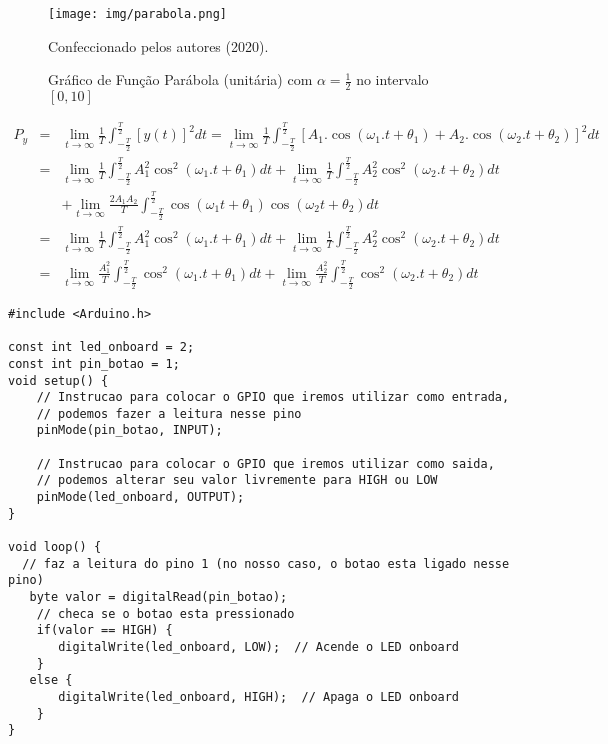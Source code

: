 
\begin{figure}[!h]
    \centering
    \texttt{[image: img/parabola.png]}
    \caption{Gráfico de Função Parábola (unitária) com $\alpha = \frac{1}{2}$ no intervalo $[0,10]$}
    \label{fig:rampa}
    \begin{flushright}
        Confeccionado pelos autores (2020).
    \end{flushright}
\end{figure} 


\begin{eqnarray*} \label{eq:py}
    P_y &=& \lim_{t\to\infty} \frac{1}{T} \int_{-\frac{T}{2}}^{\frac{T}{2}} [y(t)]^2 dt = \lim_{t\to\infty} \frac{1}{T} \int_{-\frac{T}{2}}^{\frac{T}{2}} [A_1.\cos{(\omega_1.t + \theta_1)}+A_2.\cos{(\omega_2.t + \theta_2)}]^2 dt \\
     &=& \lim_{t\to\infty} \frac{1}{T} \int_{-\frac{T}{2}}^{\frac{T}{2}} A_1^2 \cos^2(\omega_1.t+\theta_1) dt + \lim_{t\to\infty} \frac{1}{T} \int_{-\frac{T}{2}}^{\frac{T}{2}} A_2^2 \cos^2(\omega_2.t+\theta_2) dt \\
    && + \lim_{t\to\infty} \frac{2A_1A_2}{T} \int_{-\frac{T}{2}}^{\frac{T}{2}}  \cos(\omega_1t+\theta_1) \cos(\omega_2t + \theta_2) dt \\
     &=& \lim_{t\to\infty} \frac{1}{T} \int_{-\frac{T}{2}}^{\frac{T}{2}} A_1^2 \cos^2(\omega_1.t+\theta_1) dt + \lim_{t\to\infty} \frac{1}{T} \int_{-\frac{T}{2}}^{\frac{T}{2}} A_2^2 \cos^2(\omega_2.t+\theta_2) dt \\
    &=& \lim_{t\to\infty} \frac{A_1^2}{T} \int_{-\frac{T}{2}}^{\frac{T}{2}} \cos^2(\omega_1.t+\theta_1) dt + \lim_{t\to\infty} \frac{A_2^2}{T} \int_{-\frac{T}{2}}^{\frac{T}{2}} \cos^2(\omega_2.t+\theta_2) dt 
\end{eqnarray*}

\begin{lstlisting}
#include <Arduino.h>

const int led_onboard = 2;
const int pin_botao = 1; 
void setup() {
    // Instrucao para colocar o GPIO que iremos utilizar como entrada,
    // podemos fazer a leitura nesse pino
    pinMode(pin_botao, INPUT);
 
    // Instrucao para colocar o GPIO que iremos utilizar como saida,
    // podemos alterar seu valor livremente para HIGH ou LOW
    pinMode(led_onboard, OUTPUT);
}

void loop() {
  // faz a leitura do pino 1 (no nosso caso, o botao esta ligado nesse pino)
   byte valor = digitalRead(pin_botao); 
    // checa se o botao esta pressionado
    if(valor == HIGH) {         
       digitalWrite(led_onboard, LOW);  // Acende o LED onboard
    } 
   else {
       digitalWrite(led_onboard, HIGH);  // Apaga o LED onboard
    }
}
\end{lstlisting}


